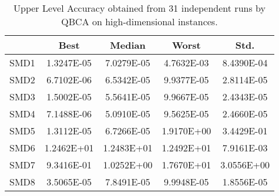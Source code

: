 \documentclass[conference]{IEEEtran}
\theoremstyle{definition}
\begin{document}
\begin{table}[htbp]
    \caption{Upper Level Accuracy obtained from 31 independent runs by QBCA on high-dimensional instances.}
    \label{tab:ul-accur}
    \centering
    \begin{tabular}{ccccc}
        \hline
        & Best &  Median  &  Worst &  Std. \\ \hline
        SMD1 & 1.3247E-05 & 7.0279E-05 %
        & 4.7632E-03 & 8.4390E-04 \\ \hline 
        SMD2 & 6.7102E-06 & 6.5342E-05 %
        & 9.9377E-05 & 2.8114E-05 \\ \hline 
        SMD3 & 1.5002E-05 & 5.5641E-05 %
        & 9.9667E-05 & 2.4343E-05 \\ \hline 
        SMD4 & 7.1488E-06 & 5.0910E-05 %
        & 9.5625E-05 & 2.4660E-05 \\ \hline 
        SMD5 & 1.3112E-05 & 6.7266E-05 %
        & 1.9170E+00 & 3.4429E-01 \\ \hline 
        SMD6 & 1.2462E+01 & 1.2483E+01 %
        & 1.2492E+01 & 7.9161E-03 \\ \hline 
        SMD7 & 9.3416E-01 & 1.0252E+00 %
        & 1.7670E+01 & 3.0556E+00 \\ \hline 
        SMD8 & 3.5065E-05 & 7.8491E-05 %
        & 9.9948E-05 & 1.8556E-05 \\ \hline 
 
    \end{tabular}
\end{table}
% 
\end{document}
